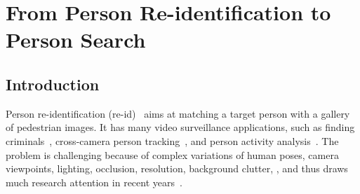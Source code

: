 \chapter{From Person Re-identification to Person Search}
\label{ch:person-search}

\section{Introduction} %
\label{sec:introduction}
Person re-identification (re-id)~\cite{zajdel2005keeping,gheissari2006person} aims at matching a target person with a gallery of pedestrian images. It has many video surveillance applications, such as finding criminals~\cite{wang2013intelligent}, cross-camera person tracking~\cite{yu2013harry}, and person activity analysis~\cite{loy2009multi}. The problem is challenging because of complex variations of human poses, camera viewpoints, lighting, occlusion, resolution, background clutter, \etc, and thus draws much research attention in recent years~\cite{zheng2015scalable,liao2015person,paisitkriangkrai2015learning,xiao2016learning,li2014deepreid,chu2016structured}.

